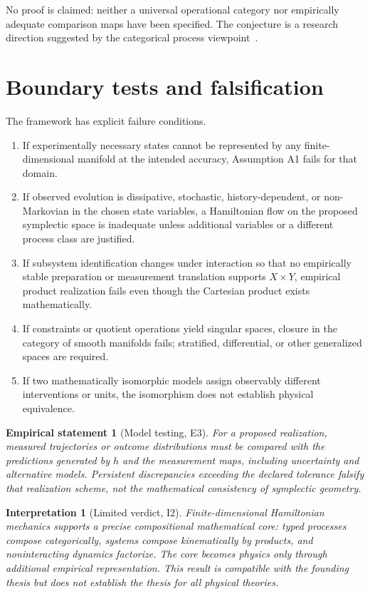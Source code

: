 \documentclass[11pt]{article}
\newtheorem{interpretation}[definition]{Interpretation}
\newtheorem{empirical}[definition]{Empirical statement}
\begin{document}
No proof is claimed: neither a universal operational category nor empirically adequate comparison maps have been specified. The conjecture is a research direction suggested by the categorical process viewpoint~\cite{BaezStay2011}.

\section{Boundary tests and falsification}

The framework has explicit failure conditions.

\begin{enumerate}[label=\textbf{F\arabic*.},leftmargin=*]
\item If experimentally necessary states cannot be represented by any finite-dimensional manifold at the intended accuracy, Assumption A1 fails for that domain.
\item If observed evolution is dissipative, stochastic, history-dependent, or non-Markovian in the chosen state variables, a Hamiltonian flow on the proposed symplectic space is inadequate unless additional variables or a different process class are justified.
\item If subsystem identification changes under interaction so that no empirically stable preparation or measurement translation supports $X\times Y$, empirical product realization fails even though the Cartesian product exists mathematically.
\item If constraints or quotient operations yield singular spaces, closure in the category of smooth manifolds fails; stratified, differential, or other generalized spaces are required.
\item If two mathematically isomorphic models assign observably different interventions or units, the isomorphism does not establish physical equivalence.
\end{enumerate}

\begin{empirical}[Model testing, E3]
For a proposed realization, measured trajectories or outcome distributions must be compared with the predictions generated by $h$ and the measurement maps, including uncertainty and alternative models. Persistent discrepancies exceeding the declared tolerance falsify that realization scheme, not the mathematical consistency of symplectic geometry.
\end{empirical}

\begin{interpretation}[Limited verdict, I2]
Finite-dimensional Hamiltonian mechanics supports a precise compositional mathematical core: typed processes compose categorically, systems compose kinematically by products, and noninteracting dynamics factorize. The core becomes physics only through additional empirical representation. This result is compatible with the founding thesis but does not establish the thesis for all physical theories.
\end{interpretation}
\end{document}
